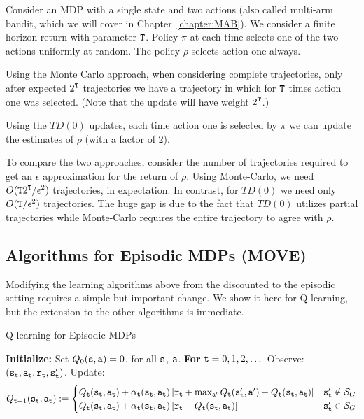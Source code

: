 \begin{example}
Consider an MDP with a single state and two actions (also called multi-arm bandit, which we will cover in Chapter~\ref{chapter:MAB}). We consider a finite horizon return with parameter ${\tt T}$. Policy $\pi$ at each time selects one of the two actions uniformly at random. The policy $\rho$ selects action one always.

Using the Monte Carlo approach, when considering complete trajectories, only after expected  $ 2^{\tt T}$ trajectories we have a trajectory in which for ${\tt T}$ times action one was selected. (Note that the update will have weight $2^{\tt T}$.)

Using the $TD(0)$ updates, each time action one is selected by $\pi$ we can update the estimates of $\rho$ (with a factor of $2$). 

To compare the two approaches, consider the number of trajectories required to get an $\epsilon$ approximation for the return of $\rho$. Using Monte-Carlo, we need $O({\tt T} 2^{\tt T}/\epsilon^2)$ trajectories, in expectation. In contrast, for $TD(0)$ we need only $O({\tt T}/\epsilon^2)$ trajectories. The huge gap is due to the fact that $TD(0)$ utilizes partial trajectories while Monte-Carlo requires the entire trajectory to agree with $\rho$.
\end{example}

\subsection{Algorithms for Episodic MDPs (MOVE)}\label{ssec:mfrl_episodic}
Modifying the learning algorithms above from the discounted to the episodic setting requires a simple but important change. We show it here for Q-learning, but the extension to the other algorithms is immediate.

\begin{algorithm}[H]
\caption{Q-learning for Episodic MDPs}
\begin{algorithmic}[1]
\State \textbf{Initialize:} Set $Q_0({\tt s},{\tt a}) = 0$, for all ${\tt s}$, ${\tt a}$.
\State \textbf{For} {${\tt t} = 0, 1, 2, \dots$}
    \State \quad Observe: $({\tt s}_{\tt t}, {\tt a}_{\tt t}, {\tt r}_{\tt t}, {\tt s}_{{\tt t}}')$.
    \State \quad Update:
    \[
    Q_{{\tt t}+1}({\tt s}_{\tt t}, {\tt a}_{\tt t}) := \begin{cases}
        Q_{\tt t}({\tt s}_{\tt t}, {\tt a}_{\tt t}) + \alpha_{\tt t}({\tt s}_{\tt t}, {\tt a}_{\tt t}) \left[{\tt r}_{\tt t} + \max_{{\tt a}'} Q_{\tt t}({\tt s}_{{\tt t}}', {\tt a}') - Q_{\tt t}({\tt s}_{\tt t}, {\tt a}_{\tt t})\right] & {\tt s}_{{\tt t}}' \notin \mathcal{S}_G\\
        Q_{\tt t}({\tt s}_{\tt t}, {\tt a}_{\tt t}) + \alpha_{\tt t}({\tt s}_{\tt t}, {\tt a}_{\tt t}) \left[{\tt r}_{\tt t}  - Q_{\tt t}({\tt s}_{\tt t}, {\tt a}_{\tt t})\right] & {\tt s}_{{\tt t}}' \in \mathcal{S}_G
    \end{cases}
    \]
\end{algorithmic}
\end{algorithm}

